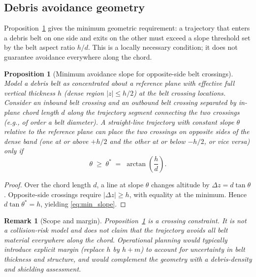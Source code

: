 \documentclass{article}
\newtheorem{proposition}{Proposition}
\newtheorem{remark}{Remark}
\begin{document}
\subsection{Debris avoidance geometry}
\label{sec:debris_geometry}

Proposition~\ref{prop:debris_slope} gives the minimum geometric requirement: a trajectory that enters a debris belt on one side and exits on the other must exceed a slope threshold set by the belt aspect ratio $h/d$. This is a locally necessary condition; it does not guarantee avoidance everywhere along the chord.

\begin{proposition}[Minimum avoidance slope for opposite-side belt crossings]
\label{prop:debris_slope}
Model a debris belt as concentrated about a reference plane with effective full vertical thickness $h$ (dense region $|z|\le h/2$) at the belt crossing locations. Consider an inbound belt crossing and an outbound belt crossing separated by in-plane chord length $d$ along the trajectory segment connecting the two crossings (e.g., of order a belt diameter). A straight-line trajectory with constant slope $\theta$ relative to the reference plane can place the two crossings on opposite sides of the dense band (one at or above $+h/2$ and the other at or below $-h/2$, or vice versa) only if
\begin{equation}
\theta \;\ge\; \theta^* \;=\; \arctan\!\left(\frac{h}{d}\right).
\label{eq:min_slope}
\end{equation}
\end{proposition}

\begin{proof}
Over the chord length $d$, a line at slope $\theta$ changes altitude by $\Delta z = d\tan\theta$. Opposite-side crossings require $|\Delta z|\ge h$, with equality at the minimum. Hence $d\tan\theta^* = h$, yielding \eqref{eq:min_slope}.
\end{proof}

\begin{remark}[Scope and margin]
Proposition~\ref{prop:debris_slope} is a crossing constraint. It is not a collision-risk model and does not claim that the trajectory avoids all belt material everywhere along the chord. Operational planning would typically introduce explicit margin (replace $h$ by $h+m$) to account for uncertainty in belt thickness and structure, and would complement the geometry with a debris-density and shielding assessment.
\end{remark}
\end{document}
